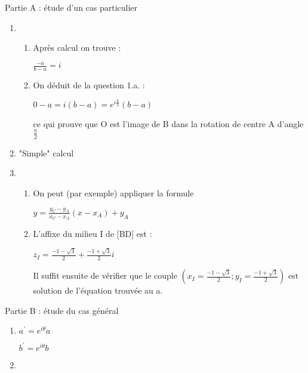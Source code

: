 \begin{corrige}
     \begin{h3}Partie A : étude d'un cas particulier\end{h3}
     \begin{enumerate}
          \item
          \begin{enumerate}[label=\alph*.]
               \item
               Après calcul on trouve :
               \par
               $\frac{- a}{b-a}=i$
               \item
               On déduit de la question 1.a. :
               \par
               $0-a=i\left(b-a\right)=e^{i\frac{\pi }{2}}\left(b-a\right)$
               \par
               ce qui prouve que O est l'image de B dans la rotation de centre A d'angle $\frac{\pi }{2}$
          \end{enumerate}
          \item
          "Simple" calcul
          \item
          \begin{enumerate}[label=\alph*.]
               \item
               On peut (par exemple) appliquer la formule
               \par
               $y=\frac{y_{C}-y_{A}}{x_{C}-x_{A}}\left(x-x_{A}\right)+y_{A}$
               \item
               L'affixe du milieu I de [BD] est :
               \par
               $z_{I}=\frac{-1-\sqrt{3}}{2}+\frac{-1+\sqrt{3}}{2}i$
               \par
               Il suffit ensuite de vérifier que le couple $\left(x_{I}=\frac{-1-\sqrt{3}}{2}; y_{I}=\frac{-1+\sqrt{3}}{2}\right)$ est solution de l'équation trouvée au a.
          \end{enumerate}
     \end{enumerate}
     \begin{h3}Partie B : étude du cas général\end{h3}
     \begin{enumerate}
          \item
          $a^{\prime}=e^{i\theta }a$
          \par
          $b^{\prime}=e^{i\theta }b$
          \item
          \begin{enumerate}[label=\alph*.]

\end{enumerate}
\end{enumerate}
\end{corrige}
